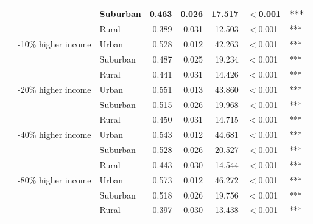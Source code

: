 \begin{longtable}[t]{>{\raggedright\arraybackslash}p{4cm}>{\raggedright\arraybackslash}p{4cm}>{\raggedright\arraybackslash}p{2.5cm}rrrll}
\cmidrule{3-8}\nopagebreak
 &  & Suburban & 0.463 & 0.026 & 17.517 & $<$0.001 & ***\\
\cmidrule{3-8}\nopagebreak
 &  & Rural & 0.389 & 0.031 & 12.503 & $<$0.001 & ***\\
\cmidrule{2-8}\nopagebreak
 & 6-10\% higher income & Urban & 0.528 & 0.012 & 42.263 & $<$0.001 & ***\\
\cmidrule{3-8}\nopagebreak
 &  & Suburban & 0.487 & 0.025 & 19.234 & $<$0.001 & ***\\
\cmidrule{3-8}\nopagebreak
 &  & Rural & 0.441 & 0.031 & 14.426 & $<$0.001 & ***\\
\cmidrule{2-8}\nopagebreak
 & 11-20\% higher income & Urban & 0.551 & 0.013 & 43.860 & $<$0.001 & ***\\
\cmidrule{3-8}\nopagebreak
 &  & Suburban & 0.515 & 0.026 & 19.968 & $<$0.001 & ***\\
\cmidrule{3-8}\nopagebreak
 &  & Rural & 0.450 & 0.031 & 14.715 & $<$0.001 & ***\\
\cmidrule{2-8}\nopagebreak
 & 21-40\% higher income & Urban & 0.543 & 0.012 & 44.681 & $<$0.001 & ***\\
\cmidrule{3-8}\nopagebreak
 &  & Suburban & 0.528 & 0.026 & 20.527 & $<$0.001 & ***\\
\cmidrule{3-8}\nopagebreak
 &  & Rural & 0.443 & 0.030 & 14.544 & $<$0.001 & ***\\
\cmidrule{2-8}\nopagebreak
 & 41-80\% higher income & Urban & 0.573 & 0.012 & 46.272 & $<$0.001 & ***\\
\cmidrule{3-8}\nopagebreak
 &  & Suburban & 0.518 & 0.026 & 19.756 & $<$0.001 & ***\\
\cmidrule{3-8}\nopagebreak
 &  & Rural & 0.397 & 0.030 & 13.438 & $<$0.001 & ***\\
\bottomrule
\end{longtable}
